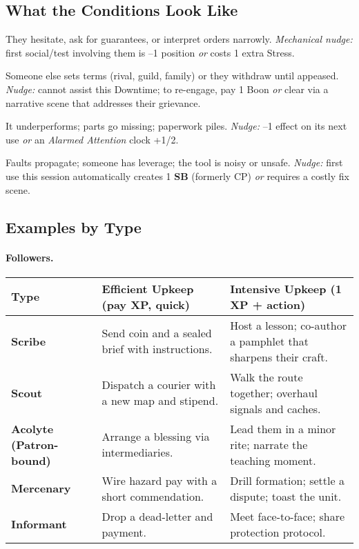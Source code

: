\subsection{What the Conditions Look Like}\label{subsec:upkeep-conditions}
\begin{description}[leftmargin=1.6em]
\item[\textsc{Wary} (Follower).] They hesitate, ask for guarantees, or interpret orders narrowly. \emph{Mechanical nudge:} first social/test involving them is --1 position \emph{or} costs 1 extra Stress.
\item[\textsc{Seized} (Follower).] Someone else sets terms (rival, guild, family) or they withdraw until appeased. \emph{Nudge:} cannot assist this Downtime; to re-engage, pay 1 Boon \emph{or} clear via a narrative scene that addresses their grievance.
\item[\textsc{Neglected} (Asset).] It underperforms; parts go missing; paperwork piles. \emph{Nudge:} --1 effect on its next use \emph{or} an \emph{Alarmed Attention} clock +1/2.
\item[\textsc{Compromised} (Asset).] Faults propagate; someone has leverage; the tool is noisy or unsafe. \emph{Nudge:} first use this session automatically creates 1 \textbf{SB} (formerly CP) \emph{or} requires a costly fix scene.
\end{description}

\subsection{Examples by Type}\label{subsec:upkeep-examples}
\paragraph{Followers.}
\begin{tabularx}{\linewidth}{>{\bfseries}l X X}
\toprule
Type & Efficient Upkeep (pay XP, quick) & Intensive Upkeep (1 XP + action) \\
\midrule
Scribe & Send coin and a sealed brief with instructions. & Host a lesson; co-author a pamphlet that sharpens their craft. \\
Scout & Dispatch a courier with a new map and stipend. & Walk the route together; overhaul signals and caches. \\
Acolyte (Patron-bound) & Arrange a blessing via intermediaries. & Lead them in a minor rite; narrate the teaching moment. \\
Mercenary & Wire hazard pay with a short commendation. & Drill formation; settle a dispute; toast the unit. \\
Informant & Drop a dead-letter and payment. & Meet face-to-face; share protection protocol. \\
\bottomrule
\end{tabularx}

